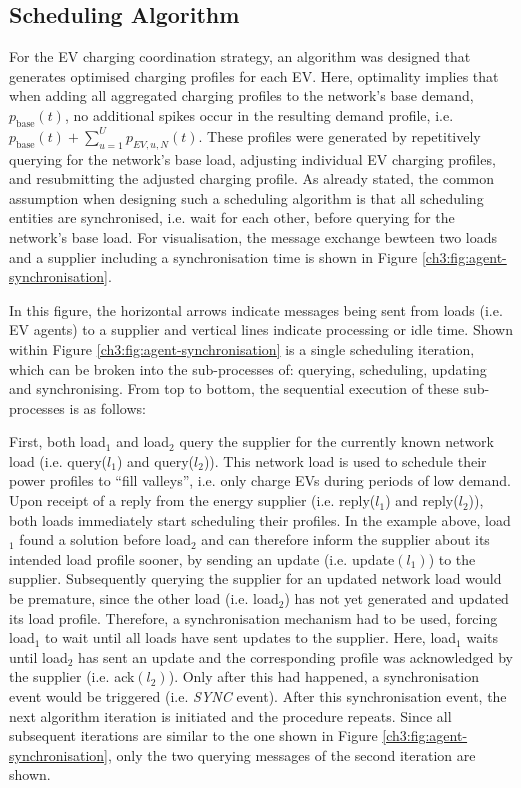 \subsection{Scheduling Algorithm}

For the EV charging coordination strategy, an algorithm was designed that generates optimised charging profiles for each EV.
Here, optimality implies that when adding all aggregated charging profiles to the network's base demand, $p_\text{base}(t)$, no additional spikes occur in the resulting demand profile, i.e. $p_\text{base}(t) + \sum_{u=1}^U p_{EV,u,N}(t)$.
These profiles were generated by repetitively querying for the network's base load, adjusting individual EV charging profiles, and resubmitting the adjusted charging profile.
As already stated, the common assumption when designing such a scheduling algorithm is that all scheduling entities are synchronised, i.e. wait for each other, before querying for the network's base load.
For visualisation, the message exchange bewteen two loads and a supplier including a synchronisation time is shown in Figure \ref{ch3:fig:agent-synchronisation}.



In this figure, the horizontal arrows indicate messages being sent from loads (i.e. EV agents) to a supplier and vertical lines indicate processing or idle time.
Shown within Figure \ref{ch3:fig:agent-synchronisation} is a single scheduling iteration, which can be broken into the sub-processes of: querying, scheduling, updating and synchronising.
From top to bottom, the sequential execution of these sub-processes is as follows:

First, both load$_1$ and load$_2$ query the supplier for the currently known network load (i.e. query($l_1$) and query($l_2$)).
This network load is used to schedule their power profiles to ``fill valleys'', i.e. only charge EVs during periods of low demand.
Upon receipt of a reply from the energy supplier (i.e. reply($l_1$) and reply($l_2$)), both loads immediately start scheduling their profiles.
In the example above, load$_1$ found a solution before load$_2$ and can therefore inform the supplier about its intended load profile sooner, by sending an update (i.e. update$(l_1)$) to the supplier.
Subsequently querying the supplier for an updated network load would be premature, since the other load (i.e. load$_2$) has not yet generated and updated its load profile.
Therefore, a synchronisation mechanism had to be used, forcing load$_1$ to wait until all loads have sent updates to the supplier.
Here, load$_1$ waits until load$_2$ has sent an update and the corresponding profile was acknowledged by the supplier (i.e. ack$(l_2)$).
Only after this had happened, a synchronisation event would be triggered (i.e. \textit{SYNC} event).
After this synchronisation event, the next algorithm iteration is initiated and the procedure repeats.
Since all subsequent iterations are similar to the one shown in Figure \ref{ch3:fig:agent-synchronisation}, only the two querying messages of the  second iteration are shown.

